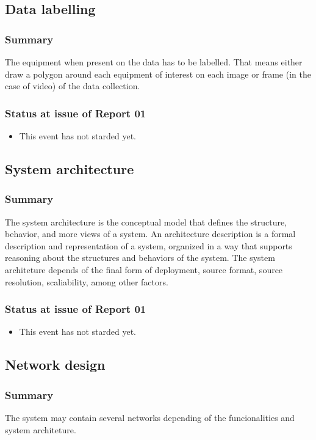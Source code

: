 \documentclass{article}
\begin{document}
\subsection{Data labelling}
\label{sec:org557463a}
\subsubsection{Summary}
\label{sec:org93fe9aa}
The equipment when present on the data has to be labelled.
That means either draw a polygon around each equipment of interest on each image or frame (in the case of video) of the data collection.
\subsubsection{Status at issue of Report 01}
\label{sec:orga03b70a}
\begin{itemize}
\item This event has not starded yet.
\end{itemize}
\subsection{System architecture}
\label{sec:org6b2d595}
\subsubsection{Summary}
\label{sec:orgb7e5900}
The system architecture is the conceptual model that defines the structure, behavior, and more views of a system.
An architecture description is a formal description and representation of a system, organized in a way that supports reasoning about the structures and behaviors of the system.
The system architeture depends of the final form of deployment, source format, source resolution, scaliability, among other factors.

\subsubsection{Status at issue of Report 01}
\label{sec:org8da3270}
\begin{itemize}
\item This event has not starded yet.
\end{itemize}

\subsection{Network design}
\label{sec:org9cd97d3}
\subsubsection{Summary}
\label{sec:org281e258}
The system may contain several networks depending of the funcionalities and system architeture.
\end{document}
